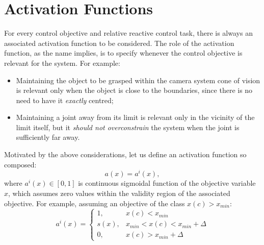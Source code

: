 \section{Activation Functions}\label{sec:activation}
For every control objective and relative reactive control task, there is always an associated activation function to be considered. The role of the activation function, as the name implies, is to specify whenever the control objective is relevant for the system. For example:
\begin{itemize}
	\item Maintaining the object to be grasped within the camera system cone of vision is relevant only when the object is close to the boundaries, since there is no need to have it \emph{exactly} centred; 
	\item Maintaining a joint away from its limit is relevant only in the vicinity of the limit itself, but it \emph{should not overconstrain} the system when the joint is sufficiently far away.
\end{itemize}

Motivated by the above considerations, let us define an activation function so composed:
\begin{equation}\label{eq:actfun}
a(x) = a^i(x),
\end{equation}
where $a^i(x) \in [0, 1]$ is continuous sigmoidal function of the objective variable $x$, which assumes zero values within the validity region of the associated objective.
For example, assuming an objective of the class $x(c) > x_{min}$:
\begin{equation}
	a^{i}(x)=
	\begin{cases}
	1,     & x(c) < x_{min}\\
	s(x), & x_{min} < x(c) <  x_{min} + \Delta\\
	0,     & x(c) > x_{min} + \Delta
	\end{cases}
	\label{eq:act_ineq}
\end{equation}

